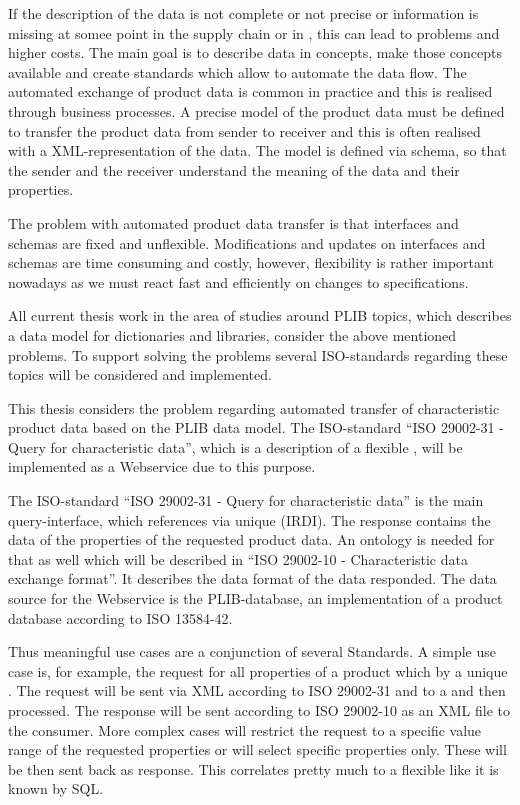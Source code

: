 If the description of the data is not complete or not precise or information is missing at somee point in the supply chain or in  , this can lead to problems and higher costs.
The main goal is to describe data in concepts, make those concepts available and create standards which allow to automate the data flow. The automated exchange of product data is common in practice and this is realised through business processes. A precise model of the product data must be defined to transfer the product data from sender to receiver and this is often realised with a XML-representation of the data. The model is defined via schema, so that the sender and the receiver understand the meaning of the data and their properties. 

The problem with automated product data transfer is that interfaces and schemas are fixed and unflexible. Modifications and updates on interfaces and schemas are time consuming and costly, however, flexibility is rather important nowadays as we must react fast and efficiently on changes to specifications. 
 
All current thesis work in the area of studies around \gls{PLIB} topics, which describes a data model for dictionaries and libraries, consider the above mentioned problems. To support solving the problems several ISO-standards regarding these topics will be considered and implemented. 

This thesis considers the problem regarding automated transfer of characteristic product data based on the \gls{PLIB} data model. The ISO-standard \enquote{ISO 29002-31 - Query for characteristic data}, which is a description of a flexible , will be implemented as a \gls{Webservice} due to this purpose. 

The ISO-standard \enquote{ISO 29002-31 - Query for characteristic data} is the main query-interface, which references  via unique  (IRDI).
The response contains the data of the properties of the requested product data. An ontology is needed for that as well which will be described in \enquote{ISO 29002-10 - Characteristic data exchange format}. It describes the data format of the data responded. The data source for the \gls{Webservice} is the PLIB-database, an implementation of a product database according to ISO 13584-42. 

Thus meaningful use cases are a conjunction of several Standards. 
A simple use case is, for example, the request for all properties of a product which by a unique . The request will be sent via XML according to ISO 29002-31 and to a  and then processed. The response will be sent according to ISO 29002-10 as an XML file to the consumer. More complex cases will restrict the request to a specific value range of the requested properties or will select specific properties only. These will be then sent back as response. This  correlates pretty much to a flexible  like it is known by SQL. 

